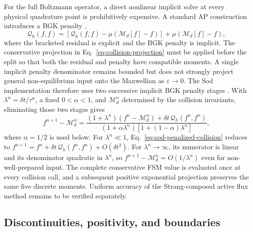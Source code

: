 \documentclass[preprint,3p,12pt]{elsarticle}
\begin{document}
For the full Boltzmann operator, a direct nonlinear implicit solve at every physical quadrature point is prohibitively expensive. A standard AP construction introduces a BGK penalty \cite{filbet2010ap,dimarco2013imex},
\begin{equation}
  \mathcal{Q}_h(f,f)
  =\left[\mathcal{Q}_h(f,f)
    -\mu\left(\mathcal{M}_d[f]-f\right)\right]
   +\mu\left(\mathcal{M}_d[f]-f\right),
  \label{eq:boltzmann-penalization}
\end{equation}
where the bracketed residual is explicit and the BGK penalty is implicit. The conservative projection in Eq.~\eqref{eq:collision-projection} must be applied before the split so that both the residual and penalty have compatible moments. A single implicit penalty denominator remains bounded but does not strongly project general non-equilibrium input onto the Maxwellian as $\varepsilon\to0$. The Sod implementation therefore uses two successive implicit BGK penalty stages \cite{yan2013successive}. With $\lambda^n=\delta t/\tau^n$, a fixed $0<\alpha<1$, and $\mathcal{M}_d^n$ determined by the collision invariants, eliminating those two stages gives
\begin{equation}
  f^{n+1}-\mathcal{M}_d^n
  =\frac{(1+\lambda^n)(f^n-\mathcal{M}_d^n)
  +\delta t\,\mathcal{Q}_h(f^n,f^n)}
  {(1+\alpha\lambda^n)
   [1+(1-\alpha)\lambda^n]},
  \label{eq:sod-penalized-collision}
\end{equation}
where $\alpha=1/2$ is used below. For $\lambda^n\ll1$, Eq.~\eqref{eq:sod-penalized-collision} reduces to $f^{n+1}=f^n+\delta t\,\mathcal{Q}_h(f^n,f^n)+O(\delta t^2)$. For $\lambda^n\to\infty$, its numerator is linear and its denominator quadratic in $\lambda^n$, so $f^{n+1}-\mathcal{M}_d^n=O(1/\lambda^n)$ even for non-well-prepared input. The complete conservative FSM value is evaluated once at every collision call, and a subsequent positive exponential projection preserves the same five discrete moments. Uniform accuracy of the Strang-composed active flux method remains to be verified separately.

\subsection{Discontinuities, positivity, and boundaries}
\end{document}
